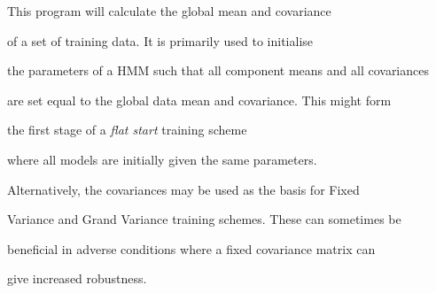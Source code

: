 













%




%








\newpage














This program will calculate the global mean and covariance


of a set of training data.  It is primarily used to initialise


the parameters of a HMM such that all component means and all covariances


are set equal to the global data mean and covariance.  This might form


the first stage of a \textit{flat start} training scheme 


where all models are initially given the same parameters.  


Alternatively, the covariances may be used as the basis for Fixed


Variance and Grand Variance training schemes.  These can sometimes be


beneficial in adverse conditions where a fixed covariance matrix can


give increased robustness.





